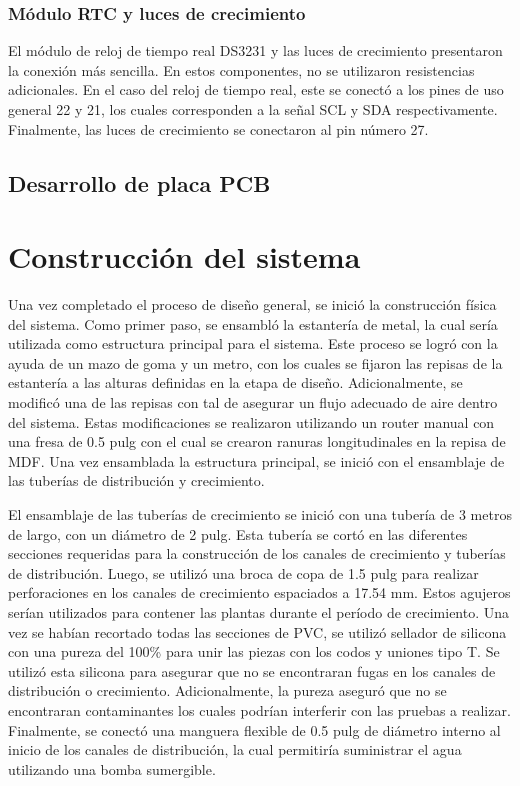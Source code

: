\subsubsection{Módulo RTC y luces de crecimiento}

El módulo de reloj de tiempo real DS3231 y las luces de crecimiento presentaron la conexión más sencilla. En estos componentes, no se utilizaron resistencias adicionales. En el caso del reloj de tiempo real, este se conectó a los pines de uso general 22 y 21, los cuales corresponden a la señal SCL y SDA respectivamente. Finalmente, las luces de crecimiento se conectaron al pin número 27.

\subsection{Desarrollo de placa PCB}			%

\section{Construcción del sistema}

Una vez completado el proceso de diseño general, se inició la construcción física del sistema. Como primer paso, se ensambló la estantería de metal, la cual sería utilizada como estructura principal para el sistema. Este proceso se logró con la ayuda de un mazo de goma y un metro, con los cuales se fijaron las repisas de la estantería a las alturas definidas en la etapa de diseño. Adicionalmente, se modificó una de las repisas con tal de asegurar un flujo adecuado de aire dentro del sistema. Estas modificaciones se realizaron utilizando un router manual con una fresa de 0.5 pulg con el cual se crearon ranuras longitudinales en la repisa de MDF. Una vez ensamblada la estructura principal, se inició con el ensamblaje de las tuberías de distribución y crecimiento.

El ensamblaje de las tuberías de crecimiento se inició con una tubería de 3 metros de largo, con un diámetro de 2 pulg. Esta tubería se cortó en las diferentes secciones requeridas para la construcción de los canales de crecimiento y tuberías de distribución. Luego, se utilizó una broca de copa de 1.5 pulg para realizar perforaciones en los canales de crecimiento espaciados a 17.54 mm. Estos agujeros serían utilizados para contener las plantas durante el período de crecimiento. Una vez se habían recortado todas las secciones de PVC, se utilizó sellador de silicona con una pureza del 100\% para unir las piezas con los codos y uniones tipo T. Se utilizó esta silicona para asegurar que no se encontraran fugas en los canales de distribución o crecimiento. Adicionalmente, la pureza aseguró que no se encontraran contaminantes los cuales podrían interferir con las pruebas a realizar. Finalmente, se conectó una manguera flexible de 0.5 pulg de diámetro interno al inicio de los canales de distribución, la cual permitiría suministrar el agua utilizando una bomba sumergible.

